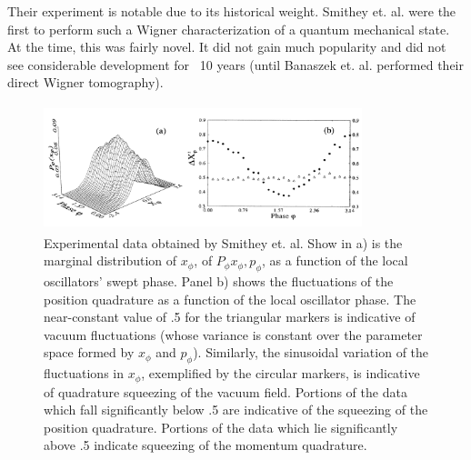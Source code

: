 Their experiment is notable due to its historical weight. Smithey et. al. were the first to perform such a Wigner characterization of a quantum mechanical state. At the time, this was fairly novel. It did not gain much popularity and did not see considerable development for ~10 years (until Banaszek et. al. performed their direct Wigner tomography).

\begin{figure}%
\includegraphics[width=350px,height=138px]{Figures/SmitheyProbabilityDistributionResults.png}%
\caption{Experimental data obtained by Smithey et. al. Show in a) is the marginal distribution of $x_\phi$, of $P_\phi{x_\phi,p_\phi}$, as a function of the local oscillators' swept phase. Panel b) shows the fluctuations of the position quadrature as a function of the local oscillator phase. The near-constant value of .5 for the triangular markers is indicative of vacuum fluctuations (whose variance is constant over the parameter space formed by $x_\phi$ and $p_\phi$). Similarly, the sinusoidal variation of the fluctuations in $x_\phi$, exemplified by the circular markers, is indicative of quadrature squeezing of the vacuum field. Portions of the data which fall significantly below .5 are indicative of the squeezing of the position quadrature. Portions of the data which lie significantly above .5 indicate squeezing of the momentum quadrature.}%
\label{SPDR}%
\end{figure}